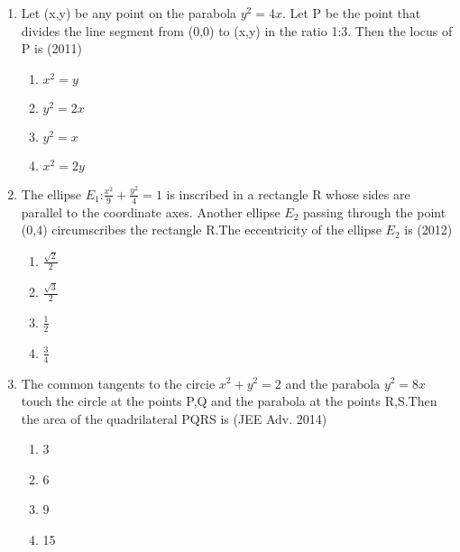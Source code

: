 \documentclass[journal,12pt,twocolumn]{IEEEtran}
\theoremstyle{remark}
\begin{document}
\begin{enumerate}
	\item Let (x,y) be any point on the parabola $y^2=4x$. Let P be the point that divides the line segment from (0,0) to (x,y) in the ratio 1:3. Then the locus of P is  \hfill(2011)\\
		\begin{enumerate}
			\item $x^2=y$
			\item $y^2=2x$
			\item $y^2=x$
			\item $x^2=2y$
		\end{enumerate}

	\item The ellipse $E_{1}$:$\frac{x^2}{9}+\frac{y^2}{4}=1$ is inscribed in a rectangle R whose sides are parallel to the coordinate axes. Another ellipse $E_{2}$ passing through the point (0,4) circumscribes the rectangle R.The eccentricity of the ellipse $E_{2}$ is \hfill(2012)\\

		\begin{enumerate}
			\item $\frac{\sqrt{2}}{2}$
			\item $\frac{\sqrt{3}}{2}$
			\item $\frac{1}{2}$
			\item $\frac{3}{4}$
		\end{enumerate}

	\item The common tangents to the circie $x^2+y^2=2$ and the parabola $y^2=8x$ touch the circle at the points P,Q and the parabola at the points R,S.Then the area of the quadrilateral PQRS is \hfill(JEE Adv. 2014)\\
		\begin{enumerate}
			\item 3
			\item 6
			\item 9
			\item 15
		\end{enumerate}
		\vspace{0.5cm}
\end{enumerate}
\end{document}
